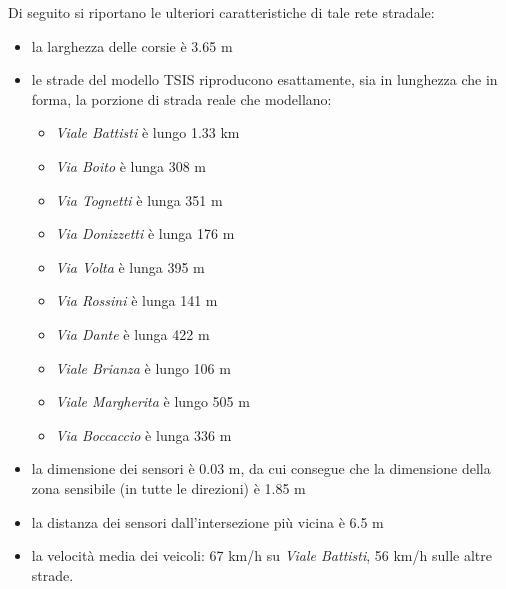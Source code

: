 Di seguito si riportano le ulteriori caratteristiche di tale rete stradale:
\begin{itemize}
	\item la larghezza delle corsie è \num{3.65} \si{\metre}
	\item le strade del modello \acs{TSIS} riproducono esattamente, sia in lunghezza che in forma, la porzione di strada reale che modellano:
	\begin{itemize}
		\item \emph{Viale Battisti} è lungo \num{1.33} \si{\kilo\metre}
		\item \emph{Via Boito} è lunga \num{308} \si{\metre}
		\item \emph{Via Tognetti} è lunga \num{351} \si{\metre}
		\item \emph{Via Donizzetti} è lunga \num{176} \si{\metre}
		\item \emph{Via Volta} è lunga \num{395} \si{\metre}
		\item \emph{Via Rossini} è lunga \num{141} \si{\metre}
		\item \emph{Via Dante} è lunga \num{422} \si{\metre}
		\item \emph{Viale Brianza} è lungo \num{106} \si{\metre}
		\item \emph{Viale Margherita} è lungo \num{505} \si{\metre}
		\item \emph{Via Boccaccio} è lunga \num{336} \si{\metre}
	\end{itemize}
	\item la dimensione dei sensori è \num{0.03} \si{\metre}, da cui consegue che la dimensione della zona sensibile (in tutte le direzioni) è \num{1.85} \si{\metre}
	\item la distanza dei sensori dall'intersezione più vicina è \num{6.5} \si{\metre}
	\item la velocità media dei veicoli: \num{67} \si{km/h} su \emph{Viale Battisti}, \num{56} \si{km/h} sulle altre strade.
\end{itemize}


